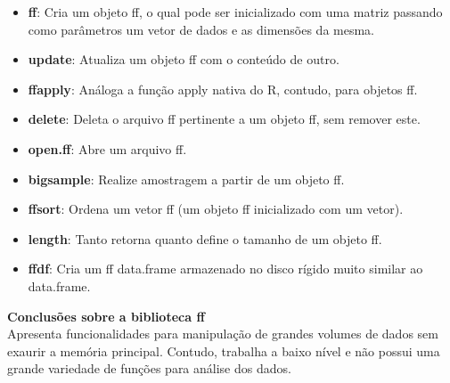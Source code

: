 \documentclass[12pt]{article}
\begin{document}
\begin{itemize}
\item \textbf{ff}: Cria um objeto ff, o qual pode ser inicializado com uma matriz passando como parâmetros um vetor de dados e as dimensões da mesma.
\item \textbf{update}: Atualiza um objeto ff com o conteúdo de outro.
\item \textbf{ffapply}: Análoga a função apply nativa do R, contudo, para objetos ff.
\item \textbf{delete}: Deleta o arquivo ff pertinente a um objeto ff, sem remover este.
\item \textbf{open.ff}: Abre um arquivo ff.
\item \textbf{bigsample}: Realize amostragem a partir de um objeto ff.
\item \textbf{ffsort}: Ordena um vetor ff (um objeto ff inicializado com um vetor).
\item \textbf{length}: Tanto retorna quanto define o tamanho de um objeto ff.
\item \textbf{ffdf}: Cria um ff data.frame armazenado no disco rígido muito similar ao data.frame.
\end{itemize}

\textbf{Conclusões sobre a biblioteca ff}\\

Apresenta funcionalidades para manipulação de grandes volumes de dados sem exaurir a memória principal. Contudo, trabalha a baixo nível e não possui uma grande variedade de funções para análise dos dados.



\end{document}
